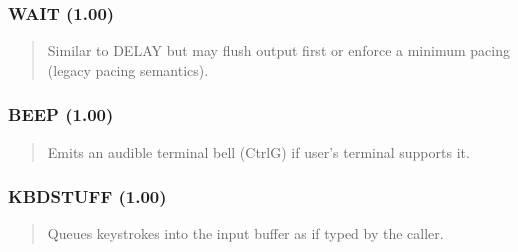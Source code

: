 \documentclass[letterpaper,10pt,english]{sphinxmanual}
\begin{document}
\subsubsection{WAIT (1.00)}
\label{\detokenize{ppl:wait-1-00}}\begin{quote}

\sphinxAtStartPar
{}
\begin{description}
\sphinxAtStartPar
Similar to DELAY but may flush output first or enforce a minimum pacing (legacy pacing semantics).

\end{description}
\end{quote}


\subsubsection{BEEP (1.00)}
\label{\detokenize{ppl:beep-1-00}}\begin{quote}

\sphinxAtStartPar
{}
\begin{description}
\sphinxAtStartPar
Emits an audible terminal bell (Ctrl\sphinxhyphen{}G) if user’s terminal supports it.

\end{description}
\end{quote}


\subsubsection{KBDSTUFF (1.00)}
\label{\detokenize{ppl:kbdstuff-1-00}}\begin{quote}

\sphinxAtStartPar
{}
\begin{description}
\sphinxAtStartPar
Queues keystrokes into the input buffer as if typed by the caller.

\end{description}
\end{quote}
\end{document}
